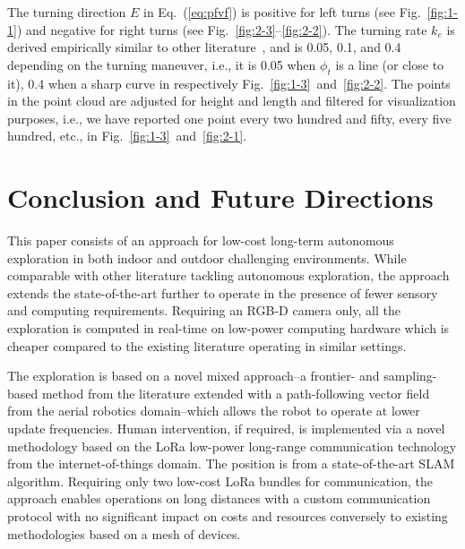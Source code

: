 \documentclass[lettersize,journal,twoside]{IEEEtran}
\theoremstyle{definition}
\begin{document}
The turning direction $E$ in Eq.~(\ref{eq:pfvf}) is positive for left turns (see Fig.~\ref{fig:1-1}) and negative for right turns (see Fig.~\ref{fig:2-3}--\ref{fig:2-2}). The turning rate $k_e$ is derived empirically similar to other literature~\cite{seewald2022energy,garcia2017guidance}, and is 0.05, 0.1, and 0.4 depending on the turning maneuver, i.e., it is 0.05 when $\phi_t$ is a line (or close to it), 0.4 when a sharp curve in respectively Fig.~\ref{fig:1-3}~and~\ref{fig:2-2}. The points in the point cloud are adjusted for height and length and filtered for visualization purposes, i.e., we have reported one point every two hundred and fifty, every five hundred, etc., in Fig.~\ref{fig:1-3}~and~\ref{fig:2-1}.

\section{Conclusion and Future Directions}
\label{sec:cf}
\noindent
This paper consists of an %
approach %
for low-cost long-term autonomous exploration in both indoor and outdoor challenging environments. While comparable with other literature tackling autonomous exploration, %
the approach extends the state-of-the-art further to operate in the presence of fewer sensory and computing requirements. Requiring an RGB-D camera only, all the exploration is computed in real-time on low-power computing hardware which is cheaper compared to the existing literature operating in similar settings.%

The exploration is based on a novel mixed approach--a frontier- and sampling-based method from the literature extended with a path-following vector field %
from the aerial robotics domain--which allows the robot to operate at lower update frequencies. 
Human intervention, if required, is implemented via a novel methodology based on the LoRa low-power long-range communication technology %
from the internet-of-things domain. The position is from a state-of-the-art SLAM algorithm. %
Requiring only two low-cost LoRa bundles for communication, the approach enables operations on long distances with a custom communication protocol with no significant impact on costs and resources conversely to existing methodologies based on a mesh of devices. %
\end{document}
